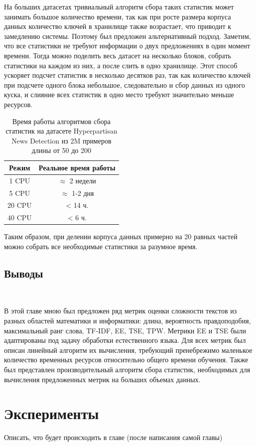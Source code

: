 \documentclass{spbau-diploma}
\begin{document}
На больших датасетах тривиальный алгоритм сбора таких статистик может занимать большое количество времени, так как при росте размера корпуса данных количество ключей в хранилище также возрастает, что приводит к замедлению системы. Поэтому был предложен альтернативный подход. Заметим, что все статистики не требуют информации о двух предложениях в один момент времени. Тогда можно поделить весь датасет на несколько блоков, собрать статистики на каждом из них, а после слить в одно хранилище. Этот способ ускоряет подсчет статистик в несколько десятков раз, так как количество ключей при подсчете одного блока небольшое, следовательно и сбор данных из одного куска, и слияние всех статистик в одно место требуют значительно меньше ресурсов.

\begin{table}[h]
	\caption{Время работы алгоритмов сбора статистик на датасете Hyperpartisan News Detection из 2M примеров длины от 50 до 200}
	\label{table:collect_stats_time}
	\centering
	\begin{tabular}{|c|c|}
		\hline
		Режим & Реальное время работы \\
		\hline
		1 CPU & $\approx$ 2 недели \\
		5 CPU & $\approx$ 1-2 дня \\
		20 CPU & < 14 ч. \\
		40 CPU & < 6 ч. \\
		\hline
	\end{tabular}
\end{table}

Таким образом, при делении корпуса данных примерно на 20 равных частей можно собрать все необходимые статистики за разумное время.
\pagebreak
\subsection{Выводы}
\ 

В этой главе мною был предложен ряд метрик оценки сложности текстов из разных областей математики и информатики: длина, вероятность правдоподобия, максимальный ранг слова, TF-IDF, EE, TSE, TPW. Метрики EE и TSE были адаптированы под задачу обработки естественного языка. Для всех метрик был описан линейный алгоритм их вычисления, требующий пренебрежимо маленькое количество временных ресурсов относительно общего времени обучения. Также был представлен производительный алгоритм сбора статистик, необходимых для вычисления предложенных метрик на больших объемах данных.

\section{Эксперименты} \label{sec:experiments}
Описать, что будет происходить в главе (после написания самой главы)
\end{document}
